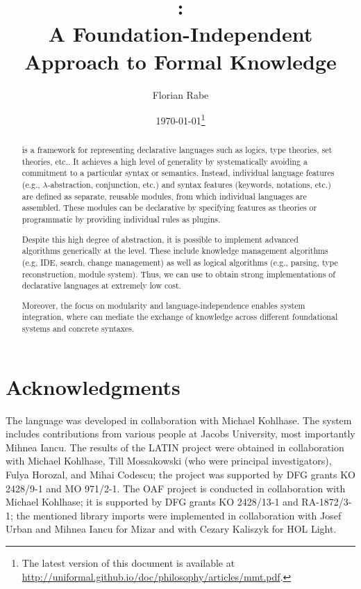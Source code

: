 \documentclass[12pt]{article}
\begin{document}
\title{\mmt:\\ A Foundation-Independent Approach to Formal Knowledge}
\author{Florian Rabe}
\date{\today\footnote{The latest version of this document is available at \url{http://uniformal.github.io/doc/philosophy/articles/mmt.pdf}.}}
\maketitle

\begin{abstract}
\mmt is a framework for representing declarative languages such as logics, type theories, set theories, etc..
It achieves a high level of generality by systematically avoiding a commitment to a particular syntax or semantics.
Instead, individual language features (e.g., $\lambda$-abstraction, conjunction, etc.) and syntax features (keywords, notations, etc.) are defined as separate, reusable modules, from which individual languages are assembled.
These modules can be declarative by specifying features as \mmt theories or programmatic by providing individual rules as plugins.

Despite this high degree of abstraction, it is possible to implement advanced algorithms generically at the \mmt level.
These include knowledge management algorithms (e.g, IDE, search, change management) as well as logical algorithms (e.g., parsing, type reconstruction, module system).
Thus, we can use \mmt to obtain strong implementations of declarative languages at extremely low cost.

Moreover, the focus on modularity and language-independence enables system integration, where \mmt can mediate the exchange of knowledge across different foundational systems and concrete syntaxes.
\end{abstract}



\section*{Acknowledgments}

The \mmt language was developed in collaboration with Michael Kohlhase.
The \mmt system includes contributions from various people at Jacobs University, most importantly Mihnea Iancu.
The results of the LATIN project were obtained in collaboration with Michael Kohlhase, Till Mossakowski (who were principal investigators), Fulya Horozal, and Mihai Codescu; the project was supported by DFG grants KO 2428/9-1 and MO 971/2-1.
The OAF project is conducted in collaboration with Michael Kohlhase; it is supported by DFG grants KO 2428/13-1 and RA-1872/3-1; the mentioned library imports were implemented in collaboration with Josef Urban and Mihnea Iancu for Mizar and with Cezary Kaliszyk for HOL Light.



\end{document}

